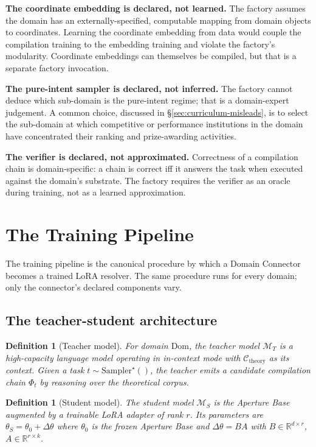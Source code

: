 \documentclass[twocolumn,11pt,a4paper]{article}
\newtheorem{definition}[theorem]{Definition}
\newcommand{\cC}{\mathcal{C}}
\newcommand{\cM}{\mathcal{M}}
\newcommand{\R}{\mathbb{R}}
\begin{document}
\textbf{The coordinate embedding is declared, not learned.} The factory assumes the domain has an externally-specified, computable mapping from domain objects to coordinates. Learning the coordinate embedding from data would couple the compilation training to the embedding training and violate the factory's modularity. Coordinate embeddings can themselves be compiled, but that is a separate factory invocation.

\textbf{The pure-intent sampler is declared, not inferred.} The factory cannot deduce which sub-domain is the pure-intent regime; that is a domain-expert judgement. A common choice, discussed in \S\ref{sec:curriculum-misleads}, is to select the sub-domain at which competitive or performance institutions in the domain have concentrated their ranking and prize-awarding activities.

\textbf{The verifier is declared, not approximated.} Correctness of a compilation chain is domain-specific: a chain is correct iff it answers the task when executed against the domain's substrate. The factory requires the verifier as an oracle during training, not as a learned approximation.


\section{The Training Pipeline}
\label{sec:pipeline}

The training pipeline is the canonical procedure by which a Domain Connector becomes a trained LoRA resolver. The same procedure runs for every domain; only the connector's declared components vary.

\subsection{The teacher-student architecture}

\begin{definition}[Teacher model]
\label{def:teacher}
For domain $\mathrm{Dom}$, the \emph{teacher model} $\cM_T$ is a high-capacity language model operating in in-context mode with $\cC_{\mathrm{theory}}$ as its context. Given a task $t \sim \mathrm{Sampler}^\star()$, the teacher emits a candidate compilation chain $\Phi_t$ by reasoning over the theoretical corpus.
\end{definition}

\begin{definition}[Student model]
\label{def:student}
The \emph{student model} $\cM_S$ is the Aperture Base augmented by a trainable LoRA adapter of rank $r$. Its parameters are $\theta_S = \theta_0 + \Delta\theta$ where $\theta_0$ is the frozen Aperture Base and $\Delta\theta = BA$ with $B \in \R^{d \times r}$, $A \in \R^{r \times k}$.
\end{definition}
\end{document}
